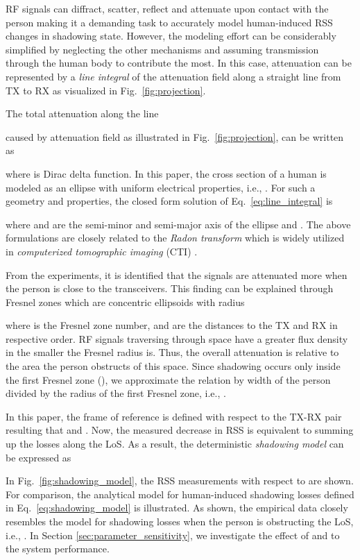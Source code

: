 \documentclass[journal, 10pt, twocolumn, balance]{IEEEtran}
\begin{document}
RF signals can diffract, scatter, reflect and attenuate upon contact with the person making it a demanding task to accurately model human-induced RSS changes in shadowing state. However, the modeling effort can be considerably simplified by neglecting the other mechanisms and assuming transmission through the human body to contribute the most. In this case, attenuation can be represented by a \emph{line integral} of the attenuation field along a straight line from TX to RX as visualized in Fig.~\ref{fig:projection}.


The total attenuation along the line 

caused by attenuation field  as illustrated in Fig.~\ref{fig:projection}, can be written as \cite[Ch. 3]{Kak1988}

where  is Dirac delta function. In this paper, the cross section of a human is modeled as an ellipse with uniform electrical properties, i.e., . For such a geometry and properties, the closed form solution of Eq.~\eqref{eq:line_integral} is 

where  and  are the semi-minor and semi-major axis of the ellipse and . The above formulations are closely related to the \emph{Radon transform} which is widely utilized in \emph{computerized tomographic imaging} (CTI) \cite[Ch. 3]{Kak1988}. 


From the experiments, it is identified that the signals are attenuated more when the person is close to the transceivers. This finding can be explained through Fresnel zones which are concentric ellipsoids with radius \cite[pp. 126-135]{rappaport1996}

where  is the Fresnel zone number, and  are the distances to the TX and RX in respective order. RF signals traversing through space have a greater flux density in  the smaller the Fresnel radius is. Thus, the overall attenuation is relative to the area the person obstructs of this space. Since shadowing occurs only inside the first Fresnel zone (), we approximate the relation by width of the person divided by the radius of the first Fresnel zone, i.e., . 


In this paper, the frame of reference is defined with respect to the TX-RX pair resulting that  and . Now, the measured decrease in RSS is equivalent to summing up the losses along the LoS. As a result, the deterministic \emph{shadowing model} can be expressed as

In Fig.~\ref{fig:shadowing_model}, the RSS measurements with respect to  are shown. For comparison, the analytical model for human-induced shadowing losses defined in Eq.~\eqref{eq:shadowing_model} is illustrated. As shown, the empirical data closely resembles the model for shadowing losses when the person is obstructing the LoS, i.e., . In Section \ref{sec:parameter_sensitivity}, we investigate the effect of  and  to the system performance.
\end{document}
